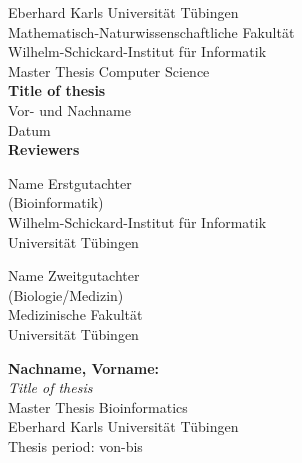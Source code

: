 \documentclass[twoside,12pt,a4paper]{report}
\begin{document}
 
\begin{titlepage}
 \begin{center}
  {\LARGE Eberhard Karls Universit\"at T\"ubingen}\\
  {\large Mathematisch-Naturwissenschaftliche Fakult\"at \\
Wilhelm-Schickard-Institut f\"ur Informatik\\[4cm]}
  {\huge Master Thesis Computer Science\\[2cm]}
  {\Large\bf  Title of thesis\\[1.5cm]}
 {\large Vor- und Nachname}\\[0.5cm]
Datum\\[4cm]
{\small\bf Reviewers}\\[0.5cm]
  \parbox{7cm}{\begin{center}{\large Name Erstgutachter}\\
   (Bioinformatik)\\
  {\footnotesize Wilhelm-Schickard-Institut f\"ur Informatik\\
	Universit\"at T\"ubingen}\end{center}}\hfill\parbox{7cm}{\begin{center}
  {\large Name Zweitgutachter}\\
  (Biologie/Medizin)\\
  {\footnotesize Medizinische Fakult\"at\\
	Universit\"at T\"ubingen}\end{center}
 }
  \end{center}
\end{titlepage}


\thispagestyle{empty}
\vspace*{\fill}
\begin{minipage}{11.2cm}
\textbf{Nachname, Vorname:}\\
\emph{Title of thesis}\\ Master Thesis Bioinformatics\\
Eberhard Karls Universit\"at T\"ubingen\\
Thesis period: von-bis
\end{minipage}
\newpage
\end{document}

